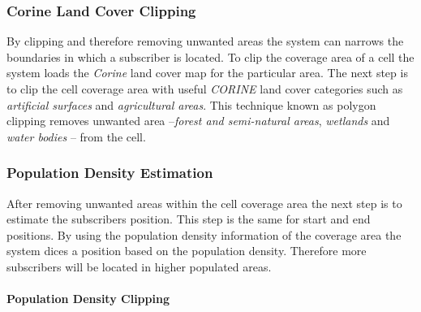 \documentclass[master,english]{hgbthesis}
\begin{document}
\subsubsection{Corine Land Cover Clipping}

By clipping and therefore removing unwanted areas the system can narrows the boundaries in which a subscriber is located. To clip the coverage area of a cell the system loads the \emph{Corine} land cover map for the particular area. The next step is to clip the cell coverage area with useful \emph{CORINE} land cover categories such as \emph{artificial surfaces} and \emph{agricultural areas}. This technique known as polygon clipping removes unwanted area --\emph{forest and semi-natural areas}, \emph{wetlands} and \emph{water bodies} -- from the cell. 


\subsubsection{Population Density Estimation}

After removing unwanted areas within the cell coverage area the next step is to estimate the subscribers position. This step is the same for start and end positions. By using the population density information of the coverage area the system dices a position based on the population density. Therefore more subscribers will be located in higher populated areas.

\paragraph{Population Density Clipping}
\end{document}
